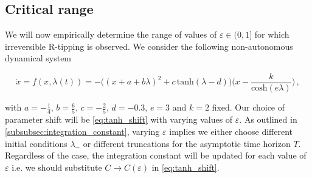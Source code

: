 \documentclass[../main.tex]{subfiles}
\begin{document}
\subsection{Critical range}\label{subsec:critical_range}

We will now empirically determine the range of values of $\varepsilon\in(0,1]$ for which irreversible R-tipping is observed. 
We consider the following non-autonomous dynamical system \cite[Example 3.1, p.2200]{Ashwin17}

\begin{equation}\label{eq:dyn_sys}
        \dot{x} = f(x, \lambda(t)) = -\bigg((x+a+b\lambda)^{2} + c\,\text{tanh}(\lambda - d)\bigg)\bigg(x - \frac{k}{\text{cosh}(e\lambda)}\bigg)\,,
\end{equation}

with $a = -\frac{1}{4},\, b = \frac{6}{5},\, c = -\frac{2}{5},\, d = -0.3,\, e = 3$ and $k = 2$ fixed.
Our choice of parameter shift will be \eqref{eq:tanh_shift} with varying values of $\varepsilon$. 
As outlined in \ref{subsubsec:integration_constant}, varying $\varepsilon$ implies we either choose different initial conditions $\lambda_{-}$ or different truncations for the asymptotic time horizon $T$.
Regardless of the case, the integration constant will be updated for each value of $\varepsilon$ i.e. we should substitute $C\to C(\varepsilon)$ in \eqref{eq:tanh_shift}.


\end{document}
